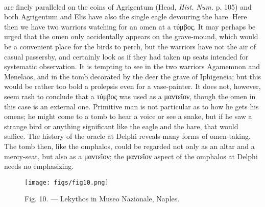 \documentclass[a4paper, 11pt, oneside, polutonikogreek, english]{article}
\begin{document}
\paragraph{}
are finely paralleled on the coins of Agrigentum (Head, \emph{Hist. Num.} p. 105) and both Agrigentum and Elis have also the single eagle devouring the hare. Here then we have two warriors watching for an omen at a τύμβος. It may perhaps be urged that the omen only accidentally appears on the grave-mound, which would be a convenient place for the birds to perch, but the warriors have not the air of casual passersby, and certainly look as if they had taken up seats intended for systematic observation. It is tempting to see in the two warriors Agamemnon and Menelaos, and in the tomb decorated by the deer the grave of Iphigeneia; but this would be rather too bold a prolepsis even for a vase-painter. It does not, however, seem rash to conclude that a τύμβος was used as a μαντεῖον, though the omen in this case is an external one. Primitive man is not particular as to how he gets his omens; he might come to a tomb to hear a voice or see a snake, but if he saw a strange bird or anything significant like the eagle and the hare, that would suffice. The history of the oracle at Delphi reveals many forms of omen-taking. The tomb then, like the omphalos, could be regarded not only as an altar and a mercy-seat, but also as a μαντεῖον; the μαντεῖον aspect of the omphalos at Delphi needs no emphasizing.
\begin{figure}[H]
\centering
\texttt{[image: figs/fig10.png]}
\caption{\Fontauri Fig. 10. --- Lekythos in Museo Nazionale, Naples.}
\end{figure}
\end{document}
